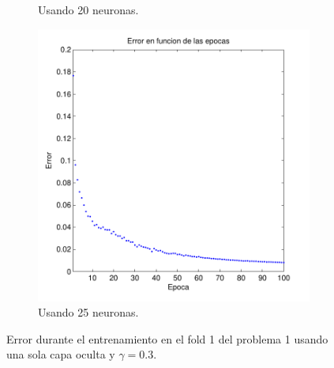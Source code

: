\documentclass[informe.tex]{subfiles}
\begin{document}
\begin{figure}[H]
\begin{subfigure}[b]{0.32\textwidth}
                \caption{Usando 20 neuronas.}
                \label{fig:d1-f1-03-n20}
        \end{subfigure}
        \begin{subfigure}[b]{0.32\textwidth}
                \includegraphics[width=\textwidth]{graficos/error_fold1_25_binary_100_03.pdf}
                \caption{Usando 25 neuronas.}
                \label{fig:d1-f1-03-n25}
        \end{subfigure}
        
        \caption{Error durante el entrenamiento en el fold 1 del problema 1 usando una sola capa oculta y $\gamma=0.3$.}\label{fig:p1-f1-gamma03}
    \end{figure}    
    
\end{document}
